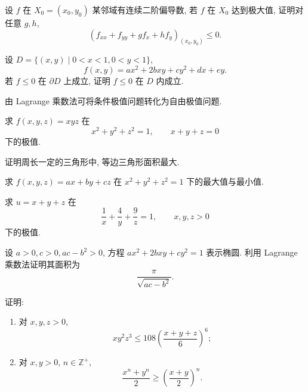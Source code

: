 \documentclass[../数学分析培优讲义.tex]{subfiles}
\begin{document}
\begin{example}
设 $f$ 在 $X_0=(x_0,y_0)$ 某邻域有连续二阶偏导数, 若 $f$ 在 $X_0$ 达到极大值, 证明对任意 $g,h$,
\[
    \left(f_{xx}+f_{yy}+gf_x+hf_y\right)_{(x_0,y_0)}\leq0.
\]
\end{example}
\exampleblank

\begin{example}
设 $D=\{(x,y)\mid0<x<1,0<y<1\}$,
\[
    f(x,y)=ax^2+2bxy+cy^2+dx+ey.
\]
若 $f\leq0$ 在 $\partial D$ 上成立, 证明 $f\leq0$ 在 $D$ 内成立.
\end{example}
\exampleblank


\newpage


由 Lagrange 乘数法可将条件极值问题转化为自由极值问题.

\begin{example}
求 $f(x,y,z)=xyz$ 在
\[
    x^2+y^2+z^2=1,
    \qquad x+y+z=0
\]
下的极值.
\end{example}
\exampleblank

\begin{example}
证明周长一定的三角形中, 等边三角形面积最大.
\end{example}
\exampleblank

\begin{example}
求 $f(x,y,z)=ax+by+cz$ 在 $x^2+y^2+z^2=1$ 下的最大值与最小值.
\end{example}
\exampleblank

\begin{example}
求 $u=x+y+z$ 在
\[
    \dfrac{1}{x}+\dfrac{4}{y}+\dfrac{9}{z}=1,
    \qquad x,y,z>0
\]
下的极值.
\end{example}
\exampleblank

\begin{example}[\markstar]
设 $a>0,c>0,ac-b^2>0$, 方程 $ax^2+2bxy+cy^2=1$ 表示椭圆. 利用 Lagrange 乘数法证明其面积为
\[
    \dfrac{\pi}{\sqrt{ac-b^2}}.
\]
\end{example}
\exampleblank

\begin{example}
证明:
\begin{enumerate}[label=(\arabic*)]
    \item 对 $x,y,z>0$,
    \[
        xy^2z^3\leq108\left(\dfrac{x+y+z}{6}\right)^6;
    \]
    \item 对 $x,y>0$, $n\in\mathbb{Z}^+$,
    \[
        \dfrac{x^n+y^n}{2}\geq\left(\dfrac{x+y}{2}\right)^n.
    \]
\end{enumerate}
\end{example}
\exampleblank
\end{document}
